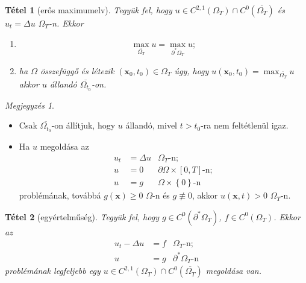 \documentclass[%
	DIV=15,appendixprefix]{scrreprt}
\newtheorem*{tetel}{Tétel}
\theoremstyle{definition}
\theoremstyle{remark}
\newtheorem*{megj}{Megjegyzés}
\begin{document}
%
\begin{tetel}[erős maximumelv]
	Tegyük fel, hogy $ u \in C^{ 2,{} 1 } \left( \Omega_{ T } \right) \cap C^{ 0 } \left(
	\overline{ \Omega_{ T } } \right) $ és $ u_{ t } = \Delta u $ $ \Omega_{ T } $-n. Ekkor
		\begin{enumerate}
		\item
			\begin{equation*}
				\max_{ \overline{ \Omega_{ T } } } u = \max_{ \partial^{ * } \Omega_{ T } } u;
			\end{equation*}
		\item ha $ \Omega $ összefüggő és létezik $ \left( \mathbf{ x }_{ 0 },{} t_{ 0 } \right) \in
			\Omega_{ T } $ úgy, hogy $ u \left(\mathbf{ x }_{ 0 },{} t_{ 0 } \right) =
			\max_{ \overline{ \Omega_{ T } } } u $ akkor $ u $ állandó
			$ \overline{ \Omega_{ t_{ 0 } } } $-on.
		\end{enumerate}
\end{tetel}
\begin{megj}\leavevmode
	\begin{itemize}
		\item Csak $ \overline{ \Omega_{ t_{ 0 } } } $-on állítjuk, hogy $ u $ állandó, mivel $ t > t_{ 0 } $-ra nem feltétlenül igaz.
		\item Ha $ u $ megoldása az
			\begin{align*}
				u_{ t } &= \Delta u & \Omega_{ T } \text{-n};\\
				u &= 0 & \partial \Omega \times \left[ 0,{} T \right] \text{-n};\\
				u &= g& \Omega \times \left\{ 0 \right\} \text{-n}
			\end{align*}
		problémának, továbbá $ g\left( \mathbf{ x } \right) \ge 0 $ $ \Omega $-n és $ g \not \equiv 0 $, akkor $ u \left( \mathbf{ x },{} t \right) > 0 $ $ \Omega_{ T } $-n.
	\end{itemize}
\end{megj}
\begin{tetel}[egyértelműség]
	Tegyük fel, hogy $ g \in C^{ 0 } \left( \partial^{ * } \Omega_{ T } \right) $, $ f \in C^{ 0 }
	\left( \Omega_{ T } \right) $. Ekkor az
	\begin{align*}
		u_{ t } - \Delta u &= f & \Omega_{ T } \text{-n};\\
		u &= g & \partial^{ * } \Omega_{ T } \text{-n}
	\end{align*}
	problémának legfeljebb egy $ u \in C^{ 2,{} 1 } \left( \Omega_{ T } \right) \cap C^{ 0 } \left(
	\overline{ \Omega_{ T } } \right) $ megoldása van.
\end{tetel}
\end{document}
